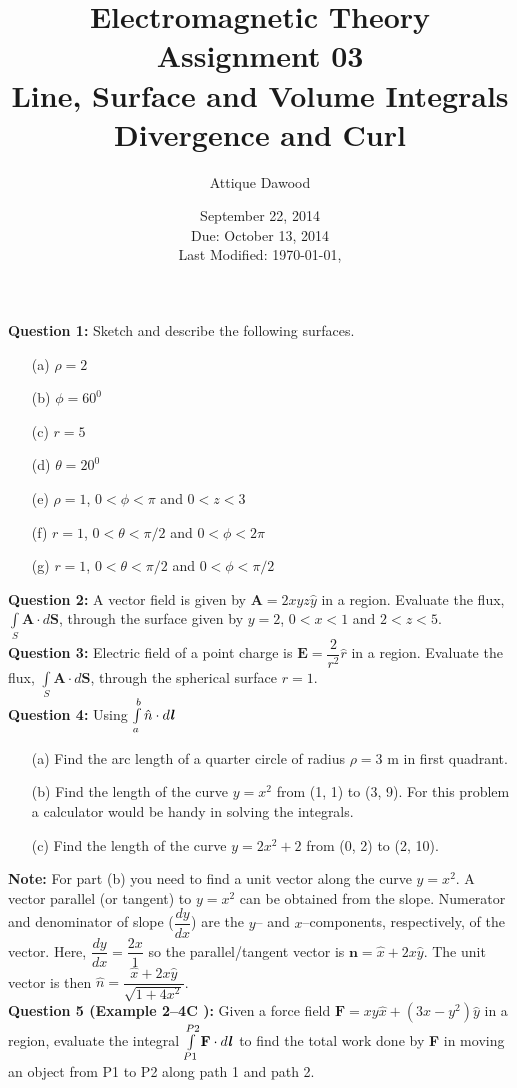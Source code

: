 \documentclass[12pt,a4paper]{article}
\title{Electromagnetic Theory\\Assignment 03\\Line, Surface and Volume Integrals\\Divergence and Curl}
\author{Attique Dawood}
\date{September 22, 2014\\Due: October 13, 2014\\[0.2cm] Last Modified: \today, \currenttime}
\begin{document}
\maketitle
\noindent\textbf{Question 1:} Sketch and describe the following surfaces.
\begin{itemize}
\item[(a)] $\rho=2$
\item[(b)] $\phi=60^0$
\item[(c)] $r=5$
\item[(d)] $\theta=20^0$
\item[(e)] $\rho=1$, $0<\phi<\pi$ and $0<z<3$
\item[(f)] $r=1$, $0<\theta<\pi/2$ and $0<\phi<2\pi$
\item[(g)] $r=1$, $0<\theta<\pi/2$ and $0<\phi<\pi/2$
\end{itemize}
\noindent\textbf{Question 2:} A vector field is given by $\textbf{A}=2xyz\hat y$ in a region. Evaluate the flux, $\int\limits_{S}\textbf{A}\cdot d\textbf{S}$, through the surface given by $y=2$, $0<x<1$ and $2<z<5$.\\[0.2cm]
\noindent\textbf{Question 3:} Electric field of a point charge is $\textbf{E}=\dfrac{2}{r^2}\hat r$ in a region. Evaluate the flux, $\int\limits_{S}\textbf{A}\cdot d\textbf{S}$, through the spherical surface $r=1$.\\[0.2cm]
\noindent\textbf{Question 4:} Using $\int\limits_{a}^{b}\hat n\cdot d\textbf{\textit{l}}$
\begin{itemize}
\item[(a)] Find the arc length of a quarter circle of radius $\rho=3$ m in first quadrant.
\item[(b)] Find the length of the curve $y=x^2$ from (1, 1) to (3, 9). For this problem a calculator would be handy in solving the integrals.
\item[(c)] Find the length of the curve $y=2x^2+2$ from (0, 2) to (2, 10).
\end{itemize}
\noindent\textbf{Note:} For part (b) you need to find a unit vector along the curve $y=x^2$. A vector parallel (or tangent) to $y=x^2$ can be obtained from the slope. Numerator and denominator of slope ($\dfrac{dy}{dx}$) are the $y$-- and $x$--components, respectively, of the vector. Here, $\dfrac{dy}{dx}=\dfrac{2x}{1}$ so the parallel/tangent vector is $\textbf{n}=\hat x+2x\hat y$. The unit vector is then $\hat n=\dfrac{\hat x+2x\hat y}{\sqrt{1+4x^2}}$.\\[0.2cm]
\newpage
\noindent\textbf{Question 5 (Example 2--4C \cite[Example 2--4, page 23]{Cheng}):} Given a force field $\textbf{F}=xy\hat x+(3x-y^2)\hat y$ in a region, evaluate the integral $\int\limits_{P1}^{P2}\textbf{F}\cdot d\textbf{\textit{l}}$ to find the total work done by \textbf{F} in moving an object from P1 to P2 along path 1 and path 2.\\[0.2cm]
\end{document}
